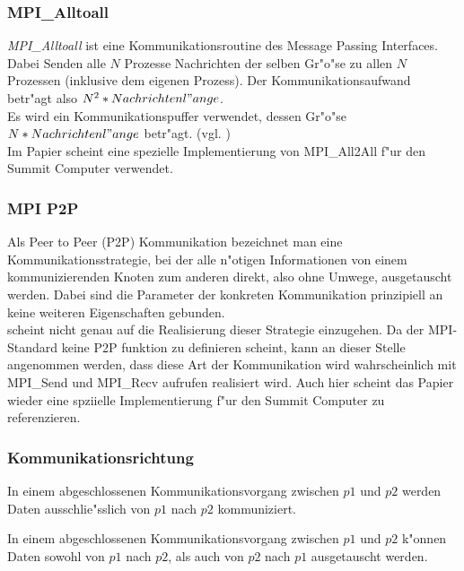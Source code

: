 \subsubsection{MPI\_Alltoall}
\textit{MPI\_Alltoall} ist eine Kommunikationsroutine des Message Passing Interfaces. Dabei Senden alle $N$ Prozesse Nachrichten der selben Gr"o"se zu allen $N$ Prozessen (inklusive dem eigenen Prozess). Der Kommunikationsaufwand betr"agt also $N^2 * Nachrichtenl"ange$.\\
Es wird ein Kommunikationspuffer verwendet, dessen Gr"o"se $N*Nachrichtenl"ange$ betr"agt. (vgl. \cite{MPImanpage})\\
Im Papier \cite{mainpaper} scheint eine spezielle Implementierung von MPI\_All2All f"ur den Summit Computer verwendet.

\subsubsection{MPI P2P}
Als Peer to Peer (P2P) Kommunikation bezeichnet man eine Kommunikationsstrategie, bei der alle n"otigen Informationen von einem kommunizierenden Knoten zum anderen direkt, also ohne Umwege, ausgetauscht werden. Dabei sind die Parameter der konkreten Kommunikation prinzipiell an keine weiteren Eigenschaften gebunden.\\
\cite{mainpaper} scheint nicht genau auf die Realisierung dieser Strategie einzugehen. Da der MPI-Standard keine P2P funktion zu definieren scheint, kann an dieser Stelle angenommen werden, dass diese Art der Kommunikation wird wahrscheinlich mit MPI\_Send und MPI\_Recv aufrufen realisiert wird.
Auch hier scheint das Papier \cite{mainpaper} wieder eine spziielle Implementierung f"ur den Summit Computer zu referenzieren.

\subsubsection{Kommunikationsrichtung}
\begin{defi}
In einem abgeschlossenen Kommunikationsvorgang zwischen $p1$ und $p2$ werden Daten ausschlie"sslich von $p1$ nach $p2$ kommuniziert.
\end{defi}
\begin{defi}
In einem abgeschlossenen Kommunikationsvorgang zwischen $p1$ und $p2$ k"onnen Daten sowohl von $p1$ nach $p2$, als auch von $p2$ nach $p1$ ausgetauscht werden.
\end{defi}

